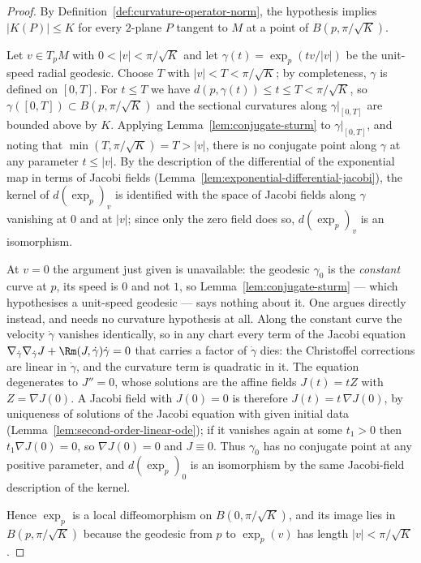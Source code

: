 \begin{proof}
By Definition~\ref{def:curvature-operator-norm}, the hypothesis
implies $|K(P)|\le K$ for every $2$-plane $P$ tangent to $M$ at a
point of $B(p,\pi/\sqrt K)$.

Let $v\in T_pM$ with $0<|v|<\pi/\sqrt K$ and let
$\gamma(t)=\exp_p(tv/|v|)$ be the unit-speed radial geodesic.
Choose $T$ with $|v|<T<\pi/\sqrt K$; by completeness,
$\gamma$ is defined on $[0,T]$. For $t\le T$ we have
$d(p,\gamma(t))\le t\le T<\pi/\sqrt{K}$, so
$\gamma([0,T])\subset B(p,\pi/\sqrt K)$ and the sectional
curvatures along $\gamma|_{[0,T]}$ are bounded above by $K$.
Applying Lemma~\ref{lem:conjugate-sturm} to $\gamma|_{[0,T]}$, and
noting that $\min(T,\pi/\sqrt K)=T>|v|$, there is no conjugate
point along
$\gamma$ at any parameter $t\le|v|$. By the description
of the differential of the exponential map in terms of Jacobi
fields (Lemma~\ref{lem:exponential-differential-jacobi}), the kernel
of $d(\exp_p)_v$ is identified with the
space of Jacobi fields along $\gamma$ vanishing at $0$ and at
$|v|$; since only the zero field does so, $d(\exp_p)_v$ is an
isomorphism.

At $v=0$ the argument just given is unavailable: the geodesic
$\gamma_0$ is the \emph{constant} curve at $p$, its speed is $0$ and
not $1$, so Lemma~\ref{lem:conjugate-sturm} --- which hypothesises a
unit-speed geodesic --- says nothing about it. One argues directly
instead, and needs no curvature hypothesis at all. Along the constant
curve the velocity $\dot\gamma$ vanishes identically, so in any chart
every term of the Jacobi equation
$\nabla_{\dot\gamma}\nabla_{\dot\gamma}J+\Rm(J,\dot\gamma)\dot\gamma=0$
that carries a factor of $\dot\gamma$ dies: the Christoffel
corrections are linear in $\dot\gamma$, and the curvature term is
quadratic in it. The equation degenerates to $J''=0$, whose solutions
are the affine fields $J(t)=tZ$ with $Z=\nabla J(0)$. A Jacobi field
with $J(0)=0$ is therefore $J(t)=t\,\nabla J(0)$, by uniqueness of
solutions of the Jacobi equation with given initial data
(Lemma~\ref{lem:second-order-linear-ode}); if it vanishes again at
some $t_1>0$ then $t_1\nabla J(0)=0$, so $\nabla J(0)=0$ and $J\equiv
0$. Thus $\gamma_0$ has no conjugate point at any positive parameter,
and $d(\exp_p)_0$ is an isomorphism by the same Jacobi-field
description of the kernel.

Hence $\exp_p$
is a local diffeomorphism on $B(0,\pi/\sqrt K)$, and its image lies
in $B(p,\pi/\sqrt K)$ because the geodesic from $p$ to
$\exp_p(v)$ has length $|v|<\pi/\sqrt K$.
\end{proof}

